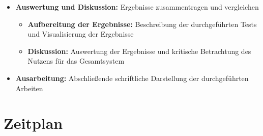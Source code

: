 \documentclass[lang=ngerman,inputenc=utf8,fontsize=10pt]{ldvarticle}
\begin{document}
\begin{itemize}
\begin{itemize}
		\end{itemize}
	\item \textbf{Auswertung und Diskussion:} Ergebnisse zusammentragen und vergleichen
		\begin{itemize}
			\item \textbf{Aufbereitung der Ergebnisse:} Beschreibung der durchgeführten Tests und Visualisierung der Ergebnisse
			\item \textbf{Diskussion:} Auswertung der Ergebnisse und kritische Betrachtung des Nutzens für das Gesamtsystem
		\end{itemize}
	\item \textbf{Ausarbeitung:} Abschließende schriftliche Darstellung der durchgeführten Arbeiten
\end{itemize}

\section{Zeitplan}
\end{document}
